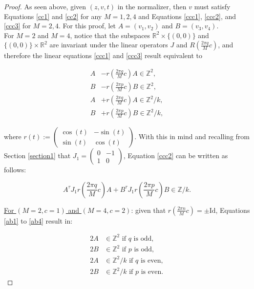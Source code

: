 \documentclass[12pt]{amsart}
\theoremstyle{plain}
\theoremstyle{definition}
\theoremstyle{remark}
\begin{document}
\begin{proof}
   As seen above, given $(z,v,t)$ in the normalizer, then $v$ must satisfy Equations \eqref{cc1} and \eqref{cc2} for any $M=1,2,4$ and Equations \eqref{ccc1}, \eqref{ccc2}, and \eqref{ccc3} for $M=2,4$. For this proof, let $A=(v_1,v_2)$ and $B=(v_3,v_4)$.\\

   For $M=2$ and $M=4$, notice that the subspaces $\mathbb{R}^2 \times \{(0,0)\}$ and $\{(0,0)\} \times \mathbb{R}^2$ are invariant under the linear operators $J$ and $R\left(\frac{2 \pi q}{M}c\right)$, and therefore the linear equations \eqref{ccc1} and \eqref{ccc3} result equivalent to 

   \begin{align}
   A& - r\left(\frac{2 \pi q}{M}c\right) A \in \mathbb{Z}^2, \label{ab1}\\
   B& - r\left(\frac{2 \pi p}{M}c\right) B \in \mathbb{Z}^2, \label{ab2}\\
   A& + r\left(\frac{2 \pi q}{M}c\right) A \in \mathbb{Z}^2/k, \label{ab3}\\
   B& + r\left(\frac{2 \pi p}{M}c\right) B \in \mathbb{Z}^2/k, \label{ab4}
   \end{align}

where $r(t) := \begin{pmatrix} 
\cos(t) & -\sin(t)\\
\sin(t) & \cos(t)
\end{pmatrix}$. With this in mind and recalling from Section \ref{section1} that $J_1 = \begin{pmatrix} 
0 & -1\\
1 & 0
\end{pmatrix}$, Equation \eqref{ccc2} can be written as follows:

\begin{equation}
   A^{\tau} J_1 r\left(\frac{2 \pi q}{M}c\right) A + B^{\tau} J_1 r\left(\frac{2 \pi p}{M}c\right) B \in \mathbb{Z}/k. \label{ab5}
\end{equation}

\underline{For $(M=2, c=1)$ and $(M=4, c=2)$}: given that $r\left(\frac{2 \pi n}{M}c\right) = \pm \text{Id}$, Equations \eqref{ab1} to \eqref{ab4} result in:


\begin{align}
   2A& \in \mathbb{Z}^2 \text{ if } q \text{ is odd}, \label{ab6}\\
   2B& \in \mathbb{Z}^2 \text{ if } p \text{ is odd}, \label{ab7}\\
   2A& \in \mathbb{Z}^2/k \text{ if } q \text{ is even}, \nonumber \\
   2B& \in \mathbb{Z}^2/k \text{ if } p \text{ is even}. \nonumber
\end{align}


\end{proof}
\end{document}
